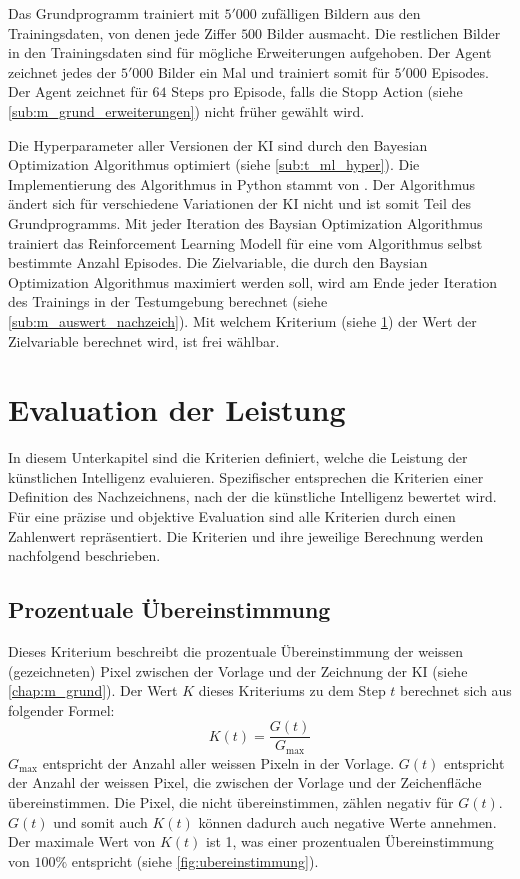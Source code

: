Das Grundprogramm trainiert mit $5'000$ zufälligen Bildern aus den
Trainingsdaten, von denen jede Ziffer $500$ Bilder ausmacht. Die restlichen
Bilder in den Trainingsdaten sind für mögliche Erweiterungen aufgehoben. Der
Agent zeichnet jedes der $5'000$ Bilder ein Mal und trainiert somit für $5'000$
Episodes. Der Agent zeichnet für $64$ Steps pro Episode, falls die Stopp Action
(siehe \ref{sub:m_grund_erweiterungen}) nicht früher gewählt wird.
 
Die Hyperparameter aller Versionen der KI sind durch den Bayesian Optimization
Algorithmus optimiert (siehe \ref{sub:t_ml_hyper}). Die Implementierung
des Algorithmus in Python stammt von \cite{nogueira_bayesian_2014}. Der
Algorithmus ändert sich für verschiedene Variationen der KI nicht und ist somit
Teil des Grundprogramms. Mit jeder Iteration des Baysian Optimization
Algorithmus trainiert das Reinforcement Learning Modell für eine vom Algorithmus
selbst bestimmte Anzahl Episodes. Die Zielvariable, die durch den Baysian
Optimization Algorithmus maximiert werden soll, wird am Ende jeder Iteration des
Trainings in der Testumgebung berechnet (siehe \ref{sub:m_auswert_nachzeich}).
Mit welchem Kriterium (siehe \ref{chap:m_eval}) der Wert der
Zielvariable berechnet wird, ist frei wählbar.
 
\section{Evaluation der Leistung}\label{chap:m_eval} In diesem Unterkapitel sind
die Kriterien definiert, welche die Leistung der künstlichen Intelligenz
evaluieren. Spezifischer entsprechen die Kriterien einer Definition des
Nachzeichnens, nach der die künstliche Intelligenz bewertet wird. Für eine
präzise und objektive Evaluation sind alle Kriterien durch einen Zahlenwert
repräsentiert. Die Kriterien und ihre jeweilige Berechnung werden nachfolgend
beschrieben.

\subsection{Prozentuale Übereinstimmung}\label{sub:m_eval_proc}
Dieses Kriterium beschreibt die prozentuale Übereinstimmung der weissen
(gezeichneten) Pixel zwischen der Vorlage und der Zeichnung der KI (siehe
\ref{chap:m_grund}). Der Wert $K$ dieses Kriteriums zu dem Step $t$
berechnet sich aus folgender Formel:
\[ K(t) = \frac{G(t)}{G_{\max}} \] $G_{\max}$ entspricht der Anzahl aller
weissen Pixeln in der Vorlage. $G(t)$ entspricht der Anzahl der weissen Pixel,
die zwischen der Vorlage und der Zeichenfläche übereinstimmen. Die Pixel, die
nicht übereinstimmen, zählen negativ für $G(t)$. $G(t)$ und somit auch $K(t)$
können dadurch auch negative Werte annehmen. Der maximale Wert von $K(t)$ ist 1,
was einer prozentualen Übereinstimmung von $100\%$ entspricht (siehe
\autoref{fig:ubereinstimmung}).
 
